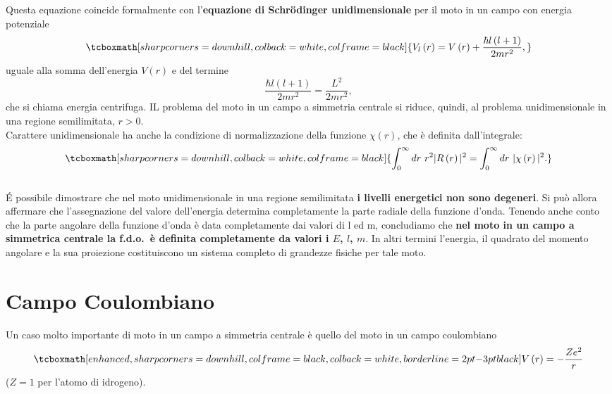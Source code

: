 \documentclass[a4paper,12pt,oneside]{book}
\begin{document}
Questa equazione coincide formalmente con l'\textbf{equazione di Schr\"{o}dinger unidimensionale} per il moto in un campo con energia potenziale
	\begin{equation}
		\tcboxmath[sharp corners=downhill, colback=white, colframe=black]{
			V_l\left(r\right)=V\left(r\right)+\frac{\hbar l\left(l+1\right)}{2mr^2} ,
			}
	\end{equation}
uguale alla somma dell'energia $V\left(r\right)$ e del termine
\begin{equation}
\frac{\hbar l\left(l+1\right)}{2mr^2}=\frac{L^2}{2mr^2} ,
\end{equation}
che si chiama energia centrifuga. IL problema del moto in un campo a simmetria centrale si riduce, quindi, al problema unidimensionale in una regione semilimitata, $r>0$.\\

Carattere unidimensionale ha anche la condizione di normalizzazione della funzione $\chi\left(r\right)$, che è definita dall'integrale:
	\begin{equation}
		\tcboxmath[sharp corners=downhill, colback=white, colframe=black]{
			\int_0^\infty dr\ r^2|R\left(r\right)|^2=\int_0^\infty dr\ |\chi\left(r\right)|^2 .
			}
	\end{equation}\\

É possibile dimostrare che nel moto unidimensionale in una regione semilimitata \textbf{i livelli energetici non sono degeneri}. Si può allora affermare che l'assegnazione del valore dell'energia determina completamente la parte radiale della funzione d'onda. Tenendo anche conto che la parte angolare della funzione d'onda è data completamente dai valori di l ed m, concludiamo che \textbf{nel moto in un campo a simmetrica centrale la f.d.o.~è definita completamente da valori i $E$, $l$, $m$}. In altri termini l'energia, il quadrato del momento angolare e la sua proiezione costituiscono un sistema completo di grandezze fisiche per tale moto.

\section{Campo Coulombiano}
Un caso molto importante di  moto in un campo a simmetria centrale è quello del moto in un campo coulombiano
	\begin{equation}
		\tcboxmath[enhanced, sharp corners=downhill, colframe=black, colback=white, borderline={2pt}{-3pt}{black}]{
			V\left(r\right)=-\frac{Ze^2}{r} 
			}
	\end{equation}
($Z=1$ per l'atomo di idrogeno).\\
\end{document}
